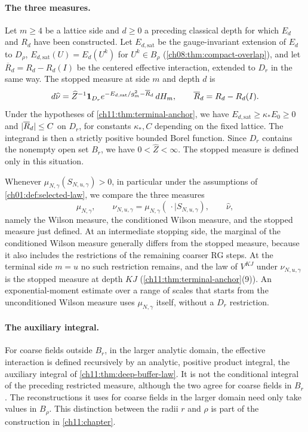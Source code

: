 \paragraph{The three measures.}
Let $m\ge4$ be a lattice side and $d\ge0$ a preceding classical depth for which $E_d$ and $R_d$ have been constructed. Let $E_{d,\mathrm{sat}}$ be the gauge-invariant extension of $E_d$ to $D_\rho$, $E_{d,\mathrm{sat}}(U)=E_d(U^k)$ for $U^k\in B_\rho$ (\cref{ch08:thm:compact-overlap}), and let $\overline R_d=R_d-R_d(I)$ be the centered effective interaction, extended to $D_r$ in the same way. The stopped measure at side $m$ and depth $d$ is
\[
 d\widehat\nu=\widehat Z^{-1}\mathbf 1_{D_r}e^{-E_{d,\mathrm{sat}}/g_m^2-\overline R_d}\,dH_m,\qquad \overline R_d=R_d-R_d(I).
\]
Under the hypotheses of \cref{ch11:thm:terminal-anchor}, we have $E_{d,\mathrm{sat}}\ge\kappa_*E_0\ge0$ and $\lvert \overline R_d\rvert\le C$ on $D_r$, for constants $\kappa_*,C$ depending on the fixed lattice. The integrand is then a strictly positive bounded Borel function. Since $D_r$ contains the nonempty open set $B_r$, we have $0<\widehat Z<\infty$. The stopped measure is defined only in this situation.

Whenever $\mu_{N,\gamma}(S_{N,u,\gamma})>0$, in particular under the assumptions of \cref{ch01:def:selected-law}, we compare the three measures
\begin{equation}\label{ch01:eq:three-measures}
 \mu_{N,\gamma},\qquad
 \nu_{N,u,\gamma}=\mu_{N,\gamma}(\,\cdot\mid S_{N,u,\gamma}),\qquad
 \widehat\nu,
\end{equation}
namely the Wilson measure, the conditioned Wilson measure, and the stopped measure just defined. At an intermediate stopping side, the marginal of the conditioned Wilson measure generally differs from the stopped measure, because it also includes the restrictions of the remaining coarser RG steps. At the terminal side $m=u$ no such restriction remains, and the law of $V^{KJ}$ under $\nu_{N,u,\gamma}$ is the stopped measure at depth $KJ$ (\cref{ch11:thm:terminal-anchor}(9)). An exponential-moment estimate over a range of scales that starts from the unconditioned Wilson measure uses $\mu_{N,\gamma}$ itself, without a $D_r$ restriction.

\paragraph{The auxiliary integral.}
For coarse fields outside $B_r$, in the larger analytic domain, the effective interaction is defined recursively by an analytic, positive product integral, the auxiliary integral of \cref{ch11:thm:deep-buffer-law}. It is not the conditional integral of the preceding restricted measure, although the two agree for coarse fields in $B_r$. The reconstructions it uses for coarse fields in the larger domain need only take values in $B_\rho$. This distinction between the radii $r$ and $\rho$ is part of the construction in \cref{ch11:chapter}.

